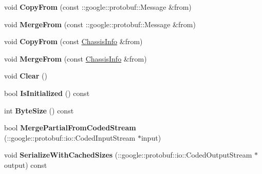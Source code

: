 \begin{DoxyCompactItemize}
void {\bfseries Copy\+From} (const \+::google\+::protobuf\+::\+Message \&from)
\item 
\mbox{\label{classcontrol_data_1_1_chassis_info_a0ad66f8dc18d579d293db5000f0736e5}} 
void {\bfseries Merge\+From} (const \+::google\+::protobuf\+::\+Message \&from)
\item 
\mbox{\label{classcontrol_data_1_1_chassis_info_af9f2e08ad16258a0e680bf615eac833d}} 
void {\bfseries Copy\+From} (const \hyperlink{classcontrol_data_1_1_chassis_info}{Chassis\+Info} \&from)
\item 
\mbox{\label{classcontrol_data_1_1_chassis_info_a32aeec67668b89dad9c9b6fe7fa30e16}} 
void {\bfseries Merge\+From} (const \hyperlink{classcontrol_data_1_1_chassis_info}{Chassis\+Info} \&from)
\item 
\mbox{\label{classcontrol_data_1_1_chassis_info_ad3b483a2494da518e2c0709922d1f969}} 
void {\bfseries Clear} ()
\item 
\mbox{\label{classcontrol_data_1_1_chassis_info_a9201a17dfc400a0175d8315f6d9b7531}} 
bool {\bfseries Is\+Initialized} () const
\item 
\mbox{\label{classcontrol_data_1_1_chassis_info_a9e1932248acf206b53ca32f69ddb8d97}} 
int {\bfseries Byte\+Size} () const
\item 
\mbox{\label{classcontrol_data_1_1_chassis_info_a683d136a0dcbd21c739c593c706c20bc}} 
bool {\bfseries Merge\+Partial\+From\+Coded\+Stream} (\+::google\+::protobuf\+::io\+::\+Coded\+Input\+Stream $\ast$input)
\item 
\mbox{\label{classcontrol_data_1_1_chassis_info_a4649af713790e6883ddfb2c499508a1a}} 
void {\bfseries Serialize\+With\+Cached\+Sizes} (\+::google\+::protobuf\+::io\+::\+Coded\+Output\+Stream $\ast$output) const
\item 
\mbox{\label{classcontrol_data_1_1_chassis_info_a872d41fbc2027300d4cf2f4a4e688b44}} 

\end{DoxyCompactItemize}
